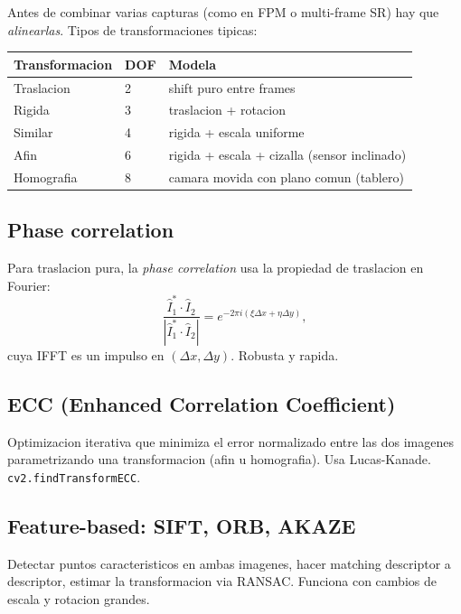 \documentclass[11pt,a4paper,twoside,openright]{book}
\begin{document}
Antes de combinar varias capturas (como en FPM o multi-frame SR) hay que \emph{alinearlas}. Tipos de transformaciones tipicas:

\begin{center}
\begin{tabular}{@{}lll@{}}
\toprule
\textbf{Transformacion} & \textbf{DOF} & \textbf{Modela} \\
\midrule
Traslacion             & 2  & shift puro entre frames \\
Rigida                 & 3  & traslacion + rotacion \\
Similar                & 4  & rigida + escala uniforme \\
Afin                   & 6  & rigida + escala + cizalla (sensor inclinado) \\
Homografia             & 8  & camara movida con plano comun (tablero) \\
\bottomrule
\end{tabular}
\end{center}

\subsection{Phase correlation}

Para traslacion pura, la \emph{phase correlation} usa la propiedad de traslacion en Fourier:
\begin{equation}
\frac{\hat{I}_1^* \cdot \hat{I}_2}{|\hat{I}_1^* \cdot \hat{I}_2|} = e^{-2\pi i (\xi \Delta x + \eta \Delta y)},
\end{equation}
cuya IFFT es un impulso en $(\Delta x, \Delta y)$. Robusta y rapida.

\subsection{ECC (Enhanced Correlation Coefficient)}

Optimizacion iterativa que minimiza el error normalizado entre las dos imagenes parametrizando una transformacion (afin u homografia). Usa Lucas-Kanade. \texttt{cv2.findTransformECC}.

\subsection{Feature-based: SIFT, ORB, AKAZE}

Detectar puntos caracteristicos en ambas imagenes, hacer matching descriptor a descriptor, estimar la transformacion via RANSAC. Funciona con cambios de escala y rotacion grandes.
\end{document}
